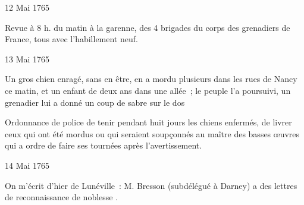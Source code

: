                      \begin{diary}{12 Mai 1765}{}
                        
                         Revue à 8 h. du matin à
                              la garenne, des
                           4 brigades du corps des grenadiers de France,
                           tous avec l'habillement neuf. \bigskip
        
        
                     \end{diary}
                     \begin{diary}{13 Mai 1765}{}
                        
                         Un gros chien enragé, sans en être, en
                           a mordu
                           plusieurs dans les rues de
                              Nancy ce matin,
                           et un enfant de deux ans dans une allée ;
                           le peuple l'a poursuivi, un grenadier lui a
                           donné un coup de sabre sur le dos \bigskip
        
        
                         Ordonnance de police de tenir pendant
                           huit
                           jours les chiens enfermés, de livrer ceux qui
                           ont été mordus ou qui seraient soupçonnés au
                           maître des basses
                              œuvres qui a ordre de
                           faire
                           ses tournées après l'avertissement. \bigskip
        
        
                     \end{diary}
                     \begin{diary}{14 Mai 1765}{}
                        
                         On m'écrit d'hier de Lunéville : \og M. Bresson (subdélégué
                              à Darney) a des lettres de
                              reconnaissance de noblesse \fg{}. \bigskip
        
        
                     \end{diary}
                     
